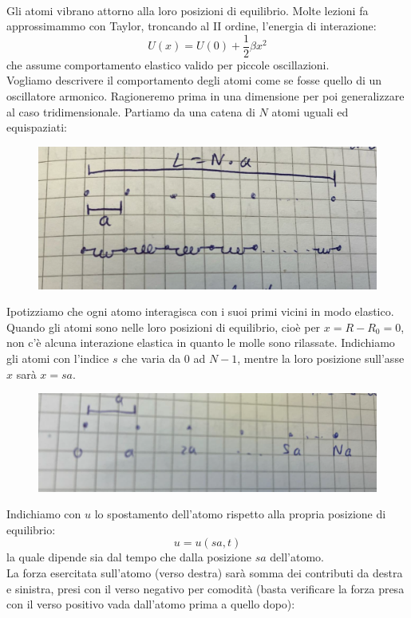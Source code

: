 \documentclass{book}
\begin{document}
        \paragraph{}
        Gli atomi vibrano attorno alla loro posizioni di equilibrio. Molte lezioni fa approssimammo con Taylor, troncando al II ordine, l'energia di interazione:
        $$U(x) = U(0)+\frac{1}{2}\beta x^{2}$$
        che assume comportamento elastico valido per piccole oscillazioni.\\
        Vogliamo descrivere il comportamento degli atomi come se fosse quello di un oscillatore armonico. Ragioneremo prima in una dimensione per poi generalizzare al caso tridimensionale. Partiamo da una catena di $N$ atomi uguali ed equispaziati:
        \begin{figure}[h!]
            \centering
            \includegraphics[width=0.5\linewidth]{img/imnothere.png}
        \end{figure}
        Ipotizziamo che ogni atomo interagisca con i suoi primi vicini in modo elastico. Quando gli atomi sono nelle loro posizioni di equilibrio, cioè per $x=R-R_{0} = 0$, non c'è alcuna interazione elastica in quanto le molle sono rilassate. Indichiamo gli atomi con l'indice $s$ che varia da $0$ ad $N-1$, mentre la loro posizione sull'asse $x$ sarà $x=sa$.
        \begin{figure}[h!]
            \centering
            \includegraphics[width=0.5\linewidth]{img/imnothere2.png}
        \end{figure}
        Indichiamo con $u$ lo spostamento dell'atomo rispetto alla propria posizione di equilibrio:
        $$u = u(sa, t)$$
        la quale dipende sia dal tempo che dalla posizione $sa$ dell'atomo.\\
        La forza esercitata sull'atomo (verso destra) sarà somma dei contributi da destra e sinistra, presi con il verso negativo per comodità (basta verificare la forza presa con il verso positivo vada dall'atomo prima a quello dopo):
\end{document}
